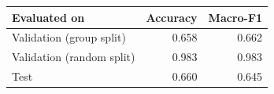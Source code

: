 \begin{tabular}{lrr}
\toprule
Evaluated on & Accuracy & Macro-F1 \\
\midrule
Validation (group split) & 0.658 & 0.662 \\
Validation (random split) & 0.983 & 0.983 \\
Test & 0.660 & 0.645 \\
\bottomrule
\end{tabular}

